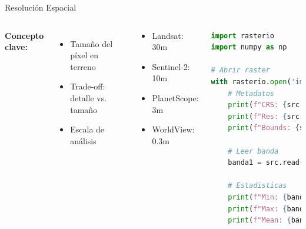 \documentclass[10pt,aspectratio=169]{beamer}
\newcommand{\examplebox}[2]{
\begin{tcolorbox}[colframe=usachblue,colback=blue!5,title=#1]
#2
\end{tcolorbox}
}
\begin{document}
\begin{frame}[fragile]{Resolución Espacial}
    \begin{columns}[T]
        \textbf{Concepto clave:}
        \begin{itemize}
            \item Tamaño del píxel en terreno
            \item Trade-off: detalle vs. tamaño
            \item Escala de análisis
        \end{itemize}
        
        \vspace{0.2cm}
        \examplebox{Resoluciones típicas}{
            \footnotesize
            \begin{itemize}
                \item Landsat: 30m
                \item Sentinel-2: 10m
                \item PlanetScope: 3m
                \item WorldView: 0.3m
            \end{itemize}
        }
        
        \begin{lstlisting}[language=Python]
import rasterio
import numpy as np

# Abrir raster
with rasterio.open('imagen.tif') as src:
    # Metadatos
    print(f"CRS: {src.crs}")
    print(f"Res: {src.res}")
    print(f"Bounds: {src.bounds}")
    
    # Leer banda
    banda1 = src.read(1)
    
    # Estadisticas
    print(f"Min: {banda1.min()}")
    print(f"Max: {banda1.max()}")
    print(f"Mean: {banda1.mean()}")
        \end{lstlisting}
    \end{columns}
\end{frame}
\end{document}
